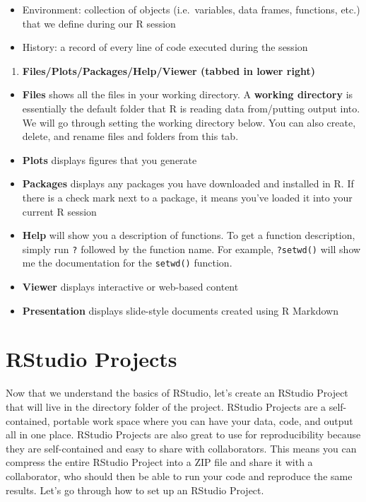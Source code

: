 \documentclass[
]{book}
\providecommand{\tightlist}{%
  \setlength{\itemsep}{0pt}\setlength{\parskip}{0pt}}
\begin{document}
\begin{itemize}
\tightlist
\item
  Environment: collection of objects (i.e.~variables, data frames, functions, etc.) that we define during our R session
\item
  History: a record of every line of code executed during the session
\end{itemize}

\begin{enumerate}
\def\labelenumi{\arabic{enumi})}
\setcounter{enumi}{2}
\tightlist
\item
  \textbf{Files/Plots/Packages/Help/Viewer (tabbed in lower right)}
\end{enumerate}

\begin{itemize}
\tightlist
\item
  \textbf{Files} shows all the files in your working directory. A \textbf{working directory} is essentially the default folder that R is reading data from/putting output into. We will go through setting the working directory below. You can also create, delete, and rename files and folders from this tab.
\item
  \textbf{Plots} displays figures that you generate
\item
  \textbf{Packages} displays any packages you have downloaded and installed in R. If there is a check mark next to a package, it means you've loaded it into your current R session
\item
  \textbf{Help} will show you a description of functions. To get a function description, simply run \texttt{?} followed by the function name. For example, \texttt{?setwd()} will show me the documentation for the \texttt{setwd()} function.
\item
  \textbf{Viewer} displays interactive or web-based content
\item
  \textbf{Presentation} displays slide-style documents created using R Markdown
\end{itemize}

\section{RStudio Projects}\label{rstudio-projects}

Now that we understand the basics of RStudio, let's create an RStudio Project that will live in the directory folder of the project. RStudio Projects are a self-contained, portable work space where you can have your data, code, and output all in one place. RStudio Projects are also great to use for reproducibility because they are self-contained and easy to share with collaborators. This means you can compress the entire RStudio Project into a ZIP file and share it with a collaborator, who should then be able to run your code and reproduce the same results. Let's go through how to set up an RStudio Project.
\end{document}

